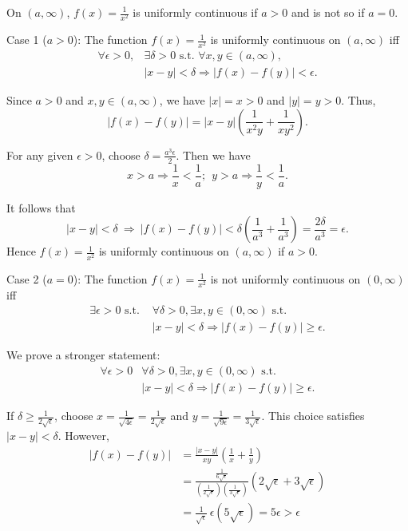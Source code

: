 \begin{exc}
  On $(a,\infty)$,
  $f(x)=\frac{1}{x^2}$ is uniformly continuous
   if $a>0$ 
   and is not so if $a=0$.
\end{exc}
\begin{solution}
  Case 1 ($a>0$):
  The function $f(x)=\frac{1}{x^2}$ is uniformly continuous
  on $(a,\infty)$ iff
  \begin{align*}
    \forall\epsilon>0,&\exists\delta>0\text{ s.t. }
                        \forall x,y \in(a,\infty),\\
    &|x-y|<\delta\Rightarrow|f(x)-f(y)|<\epsilon.
  \end{align*}

  Since $a>0$ and $x,y \in (a,\infty)$,
  we have $|x|=x>0$ and $|y|=y>0$.  Thus,
\[
|f(x)-f(y)|
=|x-y|\left(\frac{1}{x^2y}+\frac{1}{xy^2}\right).
\]

For any given $\epsilon>0$,
choose $\delta=\frac{a^3\epsilon}{2}$.
Then we have
\begin{displaymath}
  x>a\Rightarrow\frac{1}{x}<\frac{1}{a};\ \ 
  y>a\Rightarrow\frac{1}{y}<\frac{1}{a}.
\end{displaymath}

It follows that
\[
 |x-y|<\delta \ \Rightarrow\ 
|f(x)-f(y)|
<\delta\left(\frac{1}{a^3}+\frac{1}{a^3}\right)
=\frac{2\delta}{a^3}=\epsilon.
\]
Hence $f(x)=\frac{1}{x^2}$ is uniformly continuous on $(a,\infty)$ if
$a>0$.

Case 2 ($a=0$):
The function $f(x)=\frac{1}{x^2}$ is not uniformly continuous
on $(0,\infty)$ iff
\begin{align*}
  \exists\epsilon>0\text{ s.t. } & \forall\delta>0,
  \exists x,y \in (0,\infty)\text{ s.t. }\\
  &|x-y|<\delta\Rightarrow |f(x)-f(y)|\geq\epsilon.
\end{align*}

We prove a stronger statement:
\begin{align*}
  \forall\epsilon>0 & \forall\delta>0,\exists x,y \in (0,\infty)
  \text{ s.t. } \\
  &|x-y|<\delta\Rightarrow |f(x)-f(y)|\geq\epsilon.
\end{align*}

If $\delta\geq\frac{1}{2\sqrt{\epsilon}}$,
 choose
 $x=\frac{1}{\sqrt{4\epsilon}}=\frac{1}{2\sqrt{\epsilon}}$ and $y=\frac{1}{\sqrt{9\epsilon}}=\frac{1}{3\sqrt{\epsilon}}$.
This choice satisfies $|x-y|< \delta$.
However,
\begin{align*}
  |f(x)-f(y)| &=
                \frac{|x-y|}{xy}\left(\frac{1}{x}+\frac{1}{y}\right)\\
 &= \frac{\frac{1}{6\sqrt{\epsilon}}}{\left(\frac{1}{2\sqrt{\epsilon}}\right)\left(\frac{1}{3\sqrt{\epsilon}}\right)}(2\sqrt{\epsilon}+3\sqrt{\epsilon})
  \\
&= \frac{1}{\sqrt{\epsilon}}\,\epsilon(5\sqrt{\epsilon})
= 5\epsilon >\epsilon
\end{align*}


\end{solution}
